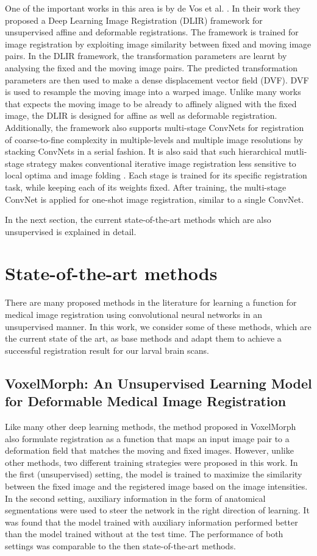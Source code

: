 \documentclass{report}
\begin{document}
	One of the important works in this area is by de Vos et al. \cite{de_Vos_2019}. In their work they proposed a Deep Learning Image Registration (DLIR) framework for unsupervised affine and deformable registrations. The framework is trained for image registration by exploiting image similarity between fixed and moving image pairs. In the DLIR framework, the transformation parameters are learnt by analysing the fixed and the moving image pairs. The predicted transformation parameters are then used to make a dense displacement vector field (DVF). DVF is used to resample the moving image into a warped image. Unlike many works that expects the moving image to be already to affinely aligned with the fixed image, the DLIR is designed for affine as well as deformable registration. Additionally, the framework also supports multi-stage ConvNets for registration of coarse-to-fine complexity in multiple-levels and multiple image resolutions by stacking ConvNets in a serial fashion. It is also said that such hierarchical mutli-stage strategy makes conventional iterative image registration less sensitive to local optima and image folding \cite{10.1007/3-540-45468-3_69}. Each stage is trained for its specific registration task, while keeping each of its weights fixed. After training, the multi-stage ConvNet is applied for one-shot image registration, similar to a single ConvNet.
	
	In the next section, the current state-of-the-art methods which are also unsupervised is explained in detail.
	
	\section{State-of-the-art methods}
	There are many proposed methods in the literature for learning a function for medical image registration using convolutional neural networks in an unsupervised manner. In this work, we consider some of these methods, which are the current state of the art, as base methods and adapt them to achieve a successful registration result for our larval brain scans.
	
	\subsection{VoxelMorph: An Unsupervised Learning Model for Deformable Medical Image Registration} 
	Like many other deep learning methods, the method proposed in VoxelMorph \cite{8579062} \cite{Balakrishnan_2019} also formulate registration as a function that maps an input image pair to a deformation field that matches the moving and fixed images. However, unlike other methods, two different training strategies were proposed in this work. In the first (unsupervised) setting, the model is trained to maximize the similarity between the fixed image and the registered image based on the image intensities. In the second setting, auxiliary information in the form of anatomical segmentations were used to steer the network in the right direction of learning. It was found that the model trained with auxiliary information performed better than the model trained without at the test time. The performance of both settings was comparable to the then state-of-the-art methods.
	
\end{document}
